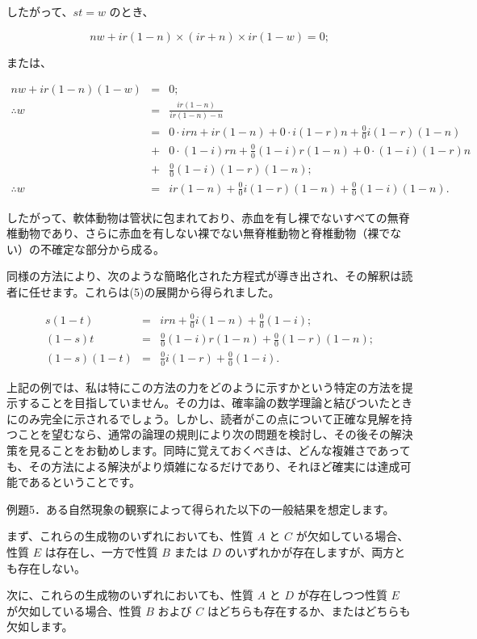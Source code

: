 \documentclass[a4paper,11pt,openany]{ltjsbook}
\begin{document}
したがって、$st=w$ のとき、

\[
nw + ir(1-n) \times (ir+n) \times ir(1-w) = 0;
\]

または、

\begin{eqnarray*}
nw + ir(1-n)(1-w) &=& 0; \\
\therefore w &=& \frac{ir(1-n)}{ir(1-n)-n} \\
&=& 0 \cdot irn + ir(1-n) + 0 \cdot i(1-r)n + \frac{0}{0}i(1-r)(1-n) \\
&+& 0 \cdot (1-i)rn + \frac{0}{0}(1-i)r(1-n) + 0 \cdot (1-i)(1-r)n \\
&+& \frac{0}{0}(1-i)(1-r)(1-n); \\
\therefore w &=& ir(1-n) + \frac{0}{0}i(1-r)(1-n) + \frac{0}{0}(1-i)(1-n).
\end{eqnarray*}

したがって、軟体動物は管状に包まれており、赤血を有し裸でないすべての無脊椎動物であり、さらに赤血を有しない裸でない無脊椎動物と脊椎動物（裸でない）の不確定な部分から成る。

同様の方法により、次のような簡略化された方程式が導き出され、その解釈は読者に任せます。これらは(5)の展開から得られました。

\begin{eqnarray*}
s(1-t) &=& irn + \frac{0}{0}i(1-n) + \frac{0}{0}(1-i); \\
(1-s)t &=& \frac{0}{0}(1-i)r(1-n) + \frac{0}{0}(1-r)(1-n); \\
(1-s)(1-t) &=& \frac{0}{0}i(1-r) + \frac{0}{0}(1-i).
\end{eqnarray*}

上記の例では、私は特にこの方法の力をどのように示すかという特定の方法を提示することを目指していません。その力は、確率論の数学理論と結びついたときにのみ完全に示されるでしょう。しかし、読者がこの点について正確な見解を持つことを望むなら、通常の論理の規則により次の問題を検討し、その後その解決策を見ることをお勧めします。同時に覚えておくべきは、どんな複雑さであっても、その方法による解決がより煩雑になるだけであり、それほど確実には達成可能であるということです。

例題5．ある自然現象の観察によって得られた以下の一般結果を想定します。

まず、これらの生成物のいずれにおいても、性質 $A$ と $C$ が欠如している場合、性質 $E$ は存在し、一方で性質 $B$ または $D$ のいずれかが存在しますが、両方とも存在しない。

次に、これらの生成物のいずれにおいても、性質 $A$ と $D$ が存在しつつ性質 $E$ が欠如している場合、性質 $B$ および $C$ はどちらも存在するか、またはどちらも欠如します。
\end{document}
